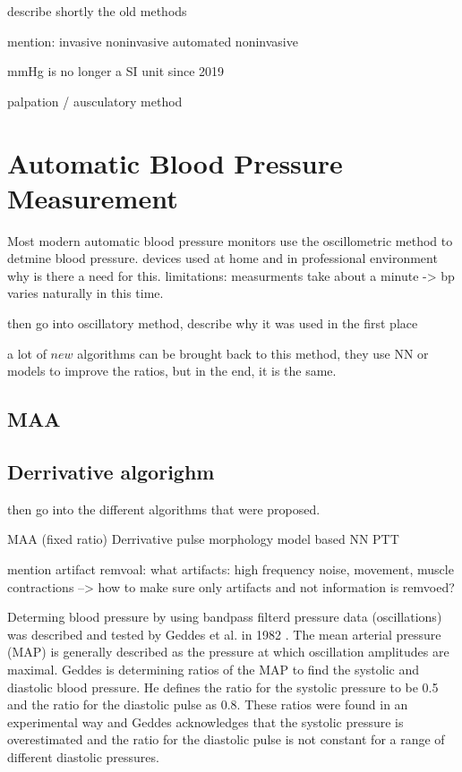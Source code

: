 describe shortly the old methods

mention:
invasive
noninvasive
automated noninvasive


mmHg is no longer a SI unit since 2019

palpation / ausculatory method


\section{Automatic Blood Pressure Measurement}
Most modern automatic blood pressure monitors use the oscillometric method to detmine blood pressure. devices used at home and in professional environment
why is there a need for this.
limitations:
measurments take about a minute -> bp varies naturally in this time.

then go into oscillatory method, describe why it was used in the first place

a lot of $new$ algorithms can be brought back to this method, they use NN or models to improve the ratios, but in the end, it is the same.

\subsection{MAA}
\subsection{Derrivative algorighm}
then go into the different algorithms that were proposed.


MAA (fixed ratio)
Derrivative
pulse morphology
model based
NN
PTT

mention artifact remvoal:
what artifacts: high frequency noise, movement, muscle contractions
 --> how to make sure only artifacts and not information is remvoed?


Determing blood pressure by using bandpass filterd pressure data (oscillations) was described and tested by Geddes et al. in 1982 \cite{Geddes1982}. The mean arterial pressure (MAP) is generally described as the pressure at which oscillation amplitudes are maximal. Geddes is determining ratios of the MAP to find the systolic and diastolic blood pressure. He defines the ratio for the systolic pressure to be 0.5 and the ratio for the diastolic pulse as 0.8. These ratios were found in an experimental way and Geddes acknowledges that the systolic pressure is overestimated and the ratio for the diastolic pulse is not constant for a range of different diastolic pressures.

